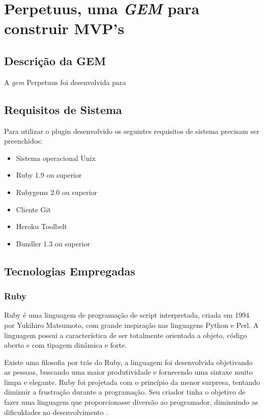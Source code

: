 \chapter{Perpetuus, uma \emph{GEM} para construir MVP's}
\label{cap:gem}

\section{Descri\c{c}\~ao da GEM}

A \emph{gem} Perpetuus foi desenvolvida para 

\section{Requisitos de Sistema}

Para utilizar o plugin desenvolvido os seguintes requisitos de sistema precisam ser preenchidos:

\begin{itemize}
\item Sistema operacional Unix
\item Ruby 1.9 ou superior
\item Rubygems 2.0 ou superior
\item Cliente Git
\item Heroku Toolbelt
\item Bundler 1.3 ou superior
\end{itemize} 

\section{Tecnologias Empregadas}

\subsection{Ruby}

Ruby \'e uma linguagem de programa\c{c}\~ao de script interpretada, criada em 1994 por Yukihiro Matsumoto, com grande inspira\c{c}\~ao nas linguagens Python e Perl. A linguagem possui a caracter\'istica de ser totalmente orientada a objeto, c\'odigo aberto e com tipagem din\^amica e forte.

Existe uma filosofia por tr\'as do Ruby, a linguagem foi desenvolvida objetivando as pessoas, buscando uma maior produtividade e fornecendo uma sintaxe muito limpa e elegante. Ruby foi projetada com o princ\'ipio da menor surpresa, tentando diminuir a frustra\c{c}\~ao durante a programa\c{c}\~ao. Seu criador tinha o objetivo de fazer uma linguagem que proporcionasse divers\~ao ao programador, diminuindo as dificuldades no desenvolvimento \cite{flanagan2008ruby}.

